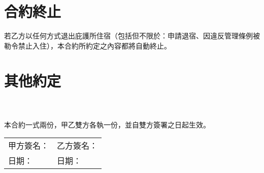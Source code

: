 \documentclass[12pt]{article}
\begin{document}
	\section{合約終止}
		若乙方以任何方式退出庇護所住宿（包括但不限於：申請退宿、因違反管理條例被勒令禁止入住），本合約所約定之內容都將自動終止。
	\section{其他約定}
	\underline{\hspace{15cm}}\\
	\underline{\hspace{15cm}}\\
	
	\vspace{2em}
	本合約一式兩份，甲乙雙方各執一份，並自雙方簽署之日起生效。
	
	\vspace{3em}
	\begin{tabular}{p{7cm}p{7cm}}
		甲方簽名：\underline{\hspace{10em}} & 乙方簽名：\underline{\hspace{10em}} \\
		日期：\underline{\hspace{12em}} & 日期：\underline{\hspace{12em}} \\
	\end{tabular}
	
\end{document}
